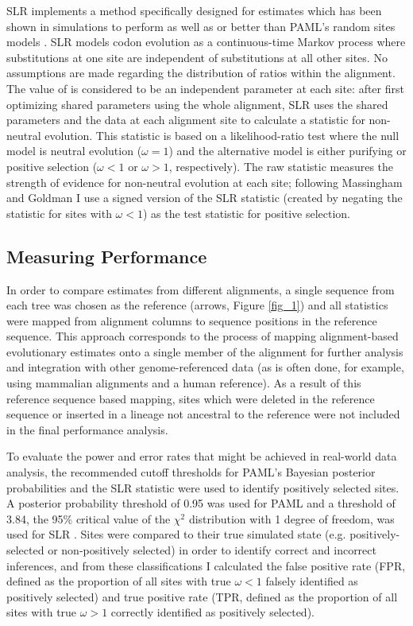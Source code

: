 SLR implements a method specifically designed for \sw estimates which
has been shown in simulations to perform as well as or better than
PAML's \sw random sites models \citep{Massingham2005Detecting}. SLR
models codon evolution as a continuous-time Markov process where
substitutions at one site are independent of substitutions at all
other sites. No assumptions are made regarding the
distribution of \omg ratios within the alignment. The value of
\omg is considered to be an independent parameter at each site:
after first optimizing shared parameters using the whole alignment,
SLR uses the shared parameters and the data at each alignment site to
calculate a \sw statistic for non-neutral evolution. This statistic is
based on a likelihood-ratio test where the null model is neutral
evolution ($\omega=1$) and the alternative model is either purifying or
positive selection ($\omega<1$ or $\omega>1$, respectively). The raw
statistic measures the strength of evidence for non-neutral evolution
at each site; following Massingham and Goldman
\citeyearpar{Massingham2005Detecting} I use a signed version of the
SLR statistic (created by negating the statistic for sites with
$\omega<1$) as the test statistic for positive selection.

\subsection{Measuring Performance}

In order to compare \sw estimates from different alignments, a single
sequence from each tree was chosen as the reference (arrows, Figure
\ref{fig_1}) and all \sw statistics were mapped from alignment columns
to sequence positions in the reference sequence. This approach
corresponds to the process of mapping alignment-based evolutionary
estimates onto a single member of the alignment for further analysis
and integration with other genome-referenced data (as is often done,
for example, using mammalian alignments and a human reference). As a
result of this reference sequence based mapping, sites which were
deleted in the reference sequence or inserted in a lineage not
ancestral to the reference were not included in the final performance
analysis.

To evaluate the power and error rates that might be achieved in
real-world data analysis, the recommended cutoff thresholds for PAML's
Bayesian posterior probabilities and the SLR statistic were used to
identify positively selected sites. A posterior probability threshold
of 0.95 was used for PAML \citep{Yang2005Bayes} and a threshold of 3.84,
the 95\% critical value of the $\chi^2$ distribution with 1 degree
of freedom, was used for SLR \citep{Massingham2005Detecting}. Sites were
compared to their true simulated state (e.g. positively-selected or
non-positively selected) in order to identify correct and incorrect
inferences, and from these classifications I calculated the false
positive rate (FPR, defined as the proportion of all sites with true
$\omega<1$ falsely identified as positively selected) and true positive rate
(TPR, defined as the proportion of all sites with true $\omega>1$ correctly
identified as positively selected).

